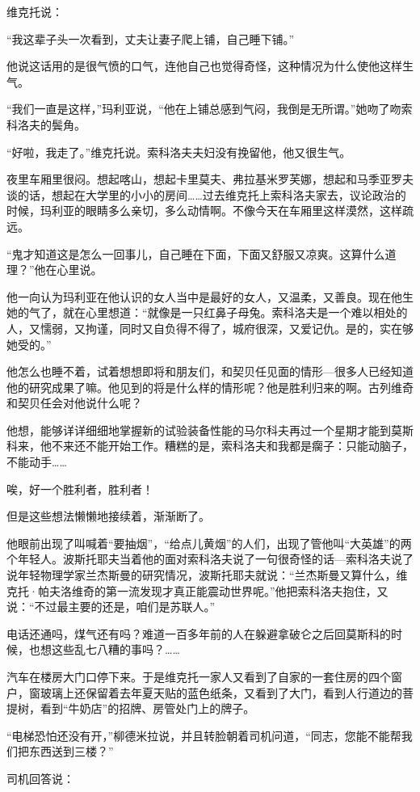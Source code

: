 维克托说：

“我这辈子头一次看到，丈夫让妻子爬上铺，自己睡下铺。”

他说这话用的是很气愤的口气，连他自己也觉得奇怪，这种情况为什么使他这样生气。

“我们一直是这样，”玛利亚说，“他在上铺总感到气闷，我倒是无所谓。”她吻了吻索科洛夫的鬓角。

“好啦，我走了。”维克托说。索科洛夫夫妇没有挽留他，他又很生气。

夜里车厢里很闷。想起喀山，想起卡里莫夫、弗拉基米罗芙娜，想起和马季亚罗夫谈的话，想起在大学里的小小的房间……过去维克托上索科洛夫家去，议论政治的时候，玛利亚的眼睛多么亲切，多么动情啊。不像今天在车厢里这样漠然，这样疏远。

“鬼才知道这是怎么一回事儿，自己睡在下面，下面又舒服又凉爽。这算什么道理？”他在心里说。

他一向认为玛利亚在他认识的女人当中是最好的女人，又温柔，又善良。现在他生她的气了，就在心里想道：“就像是一只红鼻子母兔。索科洛夫是一个难以相处的人，又懦弱，又拘谨，同时又自负得不得了，城府很深，又爱记仇。是的，实在够她受的。”

他怎么也睡不着，试着想想即将和朋友们，和契贝任见面的情形—很多人已经知道他的研究成果了嘛。他见到的将是什么样的情形呢？他是胜利归来的啊。古列维奇和契贝任会对他说什么呢？

他想，能够详详细细地掌握新的试验装备性能的马尔科夫再过一个星期才能到莫斯科来，他不来还不能开始工作。糟糕的是，索科洛夫和我都是瘸子：只能动脑子，不能动手……

唉，好一个胜利者，胜利者！

但是这些想法懒懒地接续着，渐渐断了。

他眼前出现了叫喊着“要抽烟”，“给点儿黄烟”的人们，出现了管他叫“大英雄”的两个年轻人。波斯托耶夫当着他的面对索科洛夫说了一句很奇怪的话—索科洛夫说了说年轻物理学家兰杰斯曼的研究情况，波斯托耶夫就说：“兰杰斯曼又算什么，维克托·帕夫洛维奇的第一流发现才真正能震动世界呢。”他把索科洛夫抱住，又说：“不过最主要的还是，咱们是苏联人。”

电话还通吗，煤气还有吗？难道一百多年前的人在躲避拿破仑之后回莫斯科的时候，也想这些乱七八糟的事吗？……

汽车在楼房大门口停下来。于是维克托一家人又看到了自家的一套住房的四个窗户，窗玻璃上还保留着去年夏天贴的蓝色纸条，又看到了大门，看到人行道边的菩提树，看到“牛奶店”的招牌、房管处门上的牌子。

“电梯恐怕还没有开，”柳德米拉说，并且转脸朝着司机问道，“同志，您能不能帮我们把东西送到三楼？”

司机回答说：

